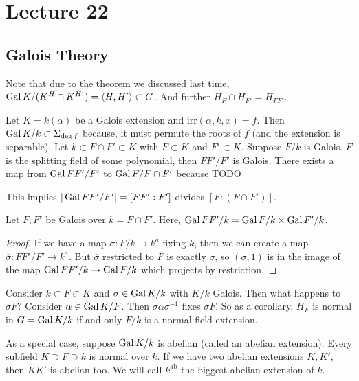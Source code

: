 \section{Lecture 22}
\subsection{Galois Theory}
Note that due to the theorem we
discussed last time, $\operatorname{Gal} K/(K^H \cap K^{H'}) = \langle H, H' \rangle \subset G$.
And further $H_F \cap H_{F'} = H_{FF'}$.

Let $K = k(\alpha)$ be a Galois extension and $\text{irr}(\alpha, k, x) = f$.
Then $\operatorname{Gal} K/k \subset \Sigma_{\deg f}$ because, 
it must permute the roots of $f$ (and the
extension is separable). Let $k \subset F \cap F' \subset K$
with $F \subset K$ and $F' \subset K$. Suppose $F/k$ is Galois.
$F$ is the splitting field of some polynomial, then $FF'/F'$ is Galois.
There exists a map from $\operatorname{Gal} FF'/F'$ to $\operatorname{Gal} F/F\cap F'$
because TODO

This implies $|\operatorname{Gal} FF'/F'| = [FF' : F']$ divides $[F: (F\cap F')]$.

\begin{theorem}
    Let $F, F'$ be Galois over $k = F \cap F'$. Here, $\operatorname{Gal} FF'/k = \operatorname{Gal} F/k \times \operatorname{Gal} F'/k$.
    \begin{proof}
        If we have a map $\sigma : F/k \to k^a$ fixing $k$, then
        we can create a map $\overline{\sigma}: FF'/F' \to k^a$. But $\overline{\sigma}$ restricted to $F$
        is exactly $\sigma$, so $(\sigma, 1)$ is in the image of the map  $\operatorname{Gal} FF'/k \to \operatorname{Gal} F/k$
        which projects by restriction.
    \end{proof}
\end{theorem}

Consider $k \subset F \subset K$ and $\sigma \in \operatorname{Gal} K/k$ with $K/k$ Galois. Then what happens to $\sigma F$?
Consider $\alpha \in \operatorname{Gal} K/F$. Then $\sigma \alpha \sigma^{-1}$ fixes $\sigma F$. So
as a corollary, $H_F$ is normal in $G = \operatorname{Gal} K/k$ if and only $F/k$ is a normal field extension.

As a special case, suppose $\operatorname{Gal} K/k$ is abelian (called an abelian extension). Every subfield $K \supset F \supset k$ is normal over $k$.
If we have two abelian extensions $K, K'$, then $KK'$ is abelian too.
We will call $k^{\text{ab}}$ the biggest abelian extension of $k$.

